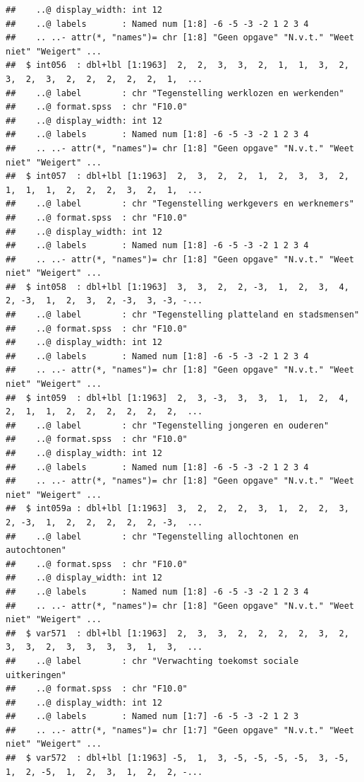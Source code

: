 \documentclass[
]{book}
\begin{document}
\begin{verbatim}
##    ..@ display_width: int 12
##    ..@ labels       : Named num [1:8] -6 -5 -3 -2 1 2 3 4
##    .. ..- attr(*, "names")= chr [1:8] "Geen opgave" "N.v.t." "Weet niet" "Weigert" ...
##  $ int056  : dbl+lbl [1:1963]  2,  2,  3,  3,  2,  1,  1,  3,  2,  3,  2,  3,  2,  2,  2,  2,  2,  1,  ...
##    ..@ label        : chr "Tegenstelling werklozen en werkenden"
##    ..@ format.spss  : chr "F10.0"
##    ..@ display_width: int 12
##    ..@ labels       : Named num [1:8] -6 -5 -3 -2 1 2 3 4
##    .. ..- attr(*, "names")= chr [1:8] "Geen opgave" "N.v.t." "Weet niet" "Weigert" ...
##  $ int057  : dbl+lbl [1:1963]  2,  3,  2,  2,  1,  2,  3,  3,  2,  1,  1,  1,  2,  2,  2,  3,  2,  1,  ...
##    ..@ label        : chr "Tegenstelling werkgevers en werknemers"
##    ..@ format.spss  : chr "F10.0"
##    ..@ display_width: int 12
##    ..@ labels       : Named num [1:8] -6 -5 -3 -2 1 2 3 4
##    .. ..- attr(*, "names")= chr [1:8] "Geen opgave" "N.v.t." "Weet niet" "Weigert" ...
##  $ int058  : dbl+lbl [1:1963]  3,  3,  2,  2, -3,  1,  2,  3,  4,  2, -3,  1,  2,  3,  2, -3,  3, -3, -...
##    ..@ label        : chr "Tegenstelling platteland en stadsmensen"
##    ..@ format.spss  : chr "F10.0"
##    ..@ display_width: int 12
##    ..@ labels       : Named num [1:8] -6 -5 -3 -2 1 2 3 4
##    .. ..- attr(*, "names")= chr [1:8] "Geen opgave" "N.v.t." "Weet niet" "Weigert" ...
##  $ int059  : dbl+lbl [1:1963]  2,  3, -3,  3,  3,  1,  1,  2,  4,  2,  1,  1,  2,  2,  2,  2,  2,  2,  ...
##    ..@ label        : chr "Tegenstelling jongeren en ouderen"
##    ..@ format.spss  : chr "F10.0"
##    ..@ display_width: int 12
##    ..@ labels       : Named num [1:8] -6 -5 -3 -2 1 2 3 4
##    .. ..- attr(*, "names")= chr [1:8] "Geen opgave" "N.v.t." "Weet niet" "Weigert" ...
##  $ int059a : dbl+lbl [1:1963]  3,  2,  2,  2,  3,  1,  2,  2,  3,  2, -3,  1,  2,  2,  2,  2,  2, -3,  ...
##    ..@ label        : chr "Tegenstelling allochtonen en autochtonen"
##    ..@ format.spss  : chr "F10.0"
##    ..@ display_width: int 12
##    ..@ labels       : Named num [1:8] -6 -5 -3 -2 1 2 3 4
##    .. ..- attr(*, "names")= chr [1:8] "Geen opgave" "N.v.t." "Weet niet" "Weigert" ...
##  $ var571  : dbl+lbl [1:1963]  2,  3,  3,  2,  2,  2,  2,  3,  2,  3,  3,  2,  3,  3,  3,  3,  1,  3,  ...
##    ..@ label        : chr "Verwachting toekomst sociale uitkeringen"
##    ..@ format.spss  : chr "F10.0"
##    ..@ display_width: int 12
##    ..@ labels       : Named num [1:7] -6 -5 -3 -2 1 2 3
##    .. ..- attr(*, "names")= chr [1:7] "Geen opgave" "N.v.t." "Weet niet" "Weigert" ...
##  $ var572  : dbl+lbl [1:1963] -5,  1,  3, -5, -5, -5, -5,  3, -5,  1,  2, -5,  1,  2,  3,  1,  2,  2, -...

\end{verbatim}
\end{document}
